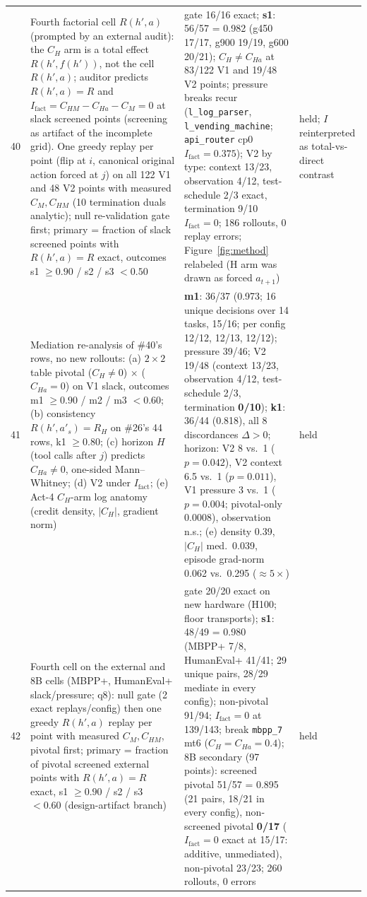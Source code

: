 \documentclass{article}
\theoremstyle{remark}
\begin{document}
\begin{table}[h]
{\begin{tabular}{clll}
40 & Fourth factorial cell $R(h',a)$ (prompted by an external audit): the $C_H$ arm is a total effect $R(h', f(h'))$, not the cell $R(h',a)$; auditor predicts $R(h',a) = R$ and $I_{\text{fact}} = C_{HM} - C_{Ha} - C_M = 0$ at slack screened points (screening as artifact of the incomplete grid). One greedy replay per point (flip at $i$, canonical original action forced at $j$) on all 122 V1 and 48 V2 points with measured $C_M, C_{HM}$ (10 termination duals analytic); null re-validation gate first; primary = fraction of slack screened points with $R(h',a) = R$ exact, outcomes s1 $\geq 0.90$ / s2 / s3 $< 0.50$ & gate 16/16 exact; \textbf{s1}: 56/57 = 0.982 (g450 17/17, g900 19/19, g600 20/21); $C_H \neq C_{Ha}$ at 83/122 V1 and 19/48 V2 points; pressure breaks recur (\texttt{l\_log\_parser}, \texttt{l\_vending\_machine}; \texttt{api\_router} cp0 $I_{\text{fact}} = 0.375$); V2 by type: context 13/23, observation 4/12, test-schedule 2/3 exact, termination 9/10 $I_{\text{fact}}=0$; 186 rollouts, 0 replay errors; Figure~\ref{fig:method} relabeled (H arm was drawn as forced $a_{t+1}$) & held; $I$ reinterpreted as total-vs-direct contrast \\
41 & Mediation re-analysis of \#40's rows, no new rollouts: (a) $2\times2$ table pivotal ($C_H\neq0$) $\times$ ($C_{Ha}=0$) on V1 slack, outcomes m1 $\geq0.90$ / m2 / m3 $<0.60$; (b) consistency $R(h',a'_s) = R_H$ on \#26's 44 rows, k1 $\geq0.80$; (c) horizon $H$ (tool calls after $j$) predicts $C_{Ha}\neq0$, one-sided Mann--Whitney; (d) V2 under $I_{\text{fact}}$; (e) Act-4 $C_H$-arm log anatomy (credit density, $|C_H|$, gradient norm) & \textbf{m1}: 36/37 (0.973; 16 unique decisions over 14 tasks, 15/16; per config 12/12, 12/13, 12/12); pressure 39/46; V2 19/48 (context 13/23, observation 4/12, test-schedule 2/3, termination \textbf{0/10}); \textbf{k1}: 36/44 (0.818), all 8 discordances $\Delta>0$; horizon: V2 8 vs.\ 1 ($p=0.042$), V2 context 6.5 vs.\ 1 ($p=0.011$), V1 pressure 3 vs.\ 1 ($p=0.004$; pivotal-only $0.0008$), observation n.s.; (e) density 0.39, $|C_H|$ med.\ 0.039, episode grad-norm 0.062 vs.\ 0.295 ($\approx 5\times$) & held \\
42 & Fourth cell on the external and 8B cells (MBPP+, HumanEval+ slack/pressure; q8): null gate (2 exact replays/config) then one greedy $R(h',a)$ replay per point with measured $C_M, C_{HM}$, pivotal first; primary = fraction of pivotal screened external points with $R(h',a) = R$ exact, s1 $\geq0.90$ / s2 / s3 $<0.60$ (design-artifact branch) & gate 20/20 exact on new hardware (H100; floor transports); \textbf{s1}: 48/49 = 0.980 (MBPP+ 7/8, HumanEval+ 41/41; 29 unique pairs, 28/29 mediate in every config); non-pivotal 91/94; $I_{\text{fact}} = 0$ at 139/143; break \texttt{mbpp\_7} mt6 ($C_H = C_{Ha} = 0.4$); 8B secondary (97 points): screened pivotal 51/57 = 0.895 (21 pairs, 18/21 in every config), non-screened pivotal \textbf{0/17} ($I_{\text{fact}} = 0$ exact at 15/17: additive, unmediated), non-pivotal 23/23; 260 rollouts, 0 errors & held \\

\end{tabular}}
\end{table}
\end{document}
